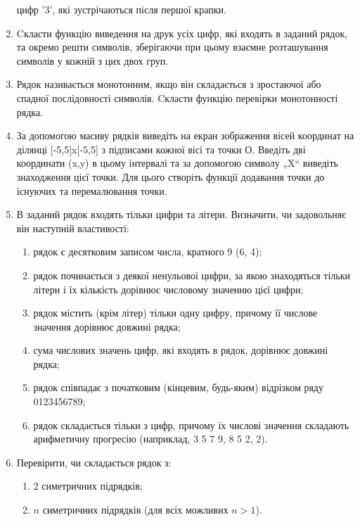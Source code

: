 \documentclass[]{article}
\makeatletter
\newcommand{\xslalph}[1]{\expandafter\@xslalph\csname c@#1\endcsname}
\newcommand{\@xslalph}[1]{%
    \ifcase#1\or а\or б\or в\or г\or д\or e\or є\or ж\or з\or i%
    \or й\or к\or л\or м\or н\or о\or п\or р\or с\or т%
    \or у\or ф\or х\or ц\or ч\or ш\or ю\or я\or аа\or бб\or вв %
    \else\@ctrerr\fi%
}
\makeatother
\begin{document}
\begin{enumerate}
  цифр '3', які зустрічаються після першої крапки.
\item
  Cкласти функцію виведення на друк усіх цифр, які входять в заданий
  рядок, та окремо решти символів, зберігаючи при цьому взаємне
  розташування символів у кожній з цих двох груп.
\item
  Рядок називається монотонним, якщо він складається з зростаючої або
  спадної послідовності символів. Cкласти функцію перевірки
  монотонності рядка.
\item
За допомогою масиву рядків виведіть на екран зображення вісей координат на ділянці
[-5,5]x[-5,5] з підписами кожної вісі та точки О. Введіть дві координати (x,y) 
в цьому інтервалі та за допомогою символу „X“ виведіть знаходження цієї точки. 
Для цього створіть функції додавання точки до існуючих та перемалювання точки.

\item
  В заданий рядок входять тільки цифри та літери. Визначити, чи
  задовольняє він наступній властивості:
  \begin{enumerate}[label=\xslalph*)]
\item рядок є десятковим записом числа, кратного 9 (6, 4);
\item рядок починається з деякої ненульової цифри, за якою знаходяться
тільки літери і їх кількість дорівнює числовому значенню цієї цифри;
\item рядок містить (крім літер) тільки одну цифру, причому її числове
значення дорівнює довжині рядка;
\item сума числових значень цифр, які входять в рядок, дорівнює довжині
рядка;
\item рядок співпадає з початковим (кінцевим, будь-яким) відрізком ряду
0123456789;
\item рядок складається тільки з цифр, причому їх числові значення
складають арифметичну прогресію (наприклад, 3 5 7 9, 8 5 2, 2).
  \end{enumerate}

\item
  Перевірити, чи складається рядок з:
 \begin{enumerate}[label=\xslalph*)]
 \item 2 симетричних підрядків;
 \item $n$ симетричних підрядків (для всіх можливих $n>1$).
 \end{enumerate}


\end{enumerate}
\end{document}

